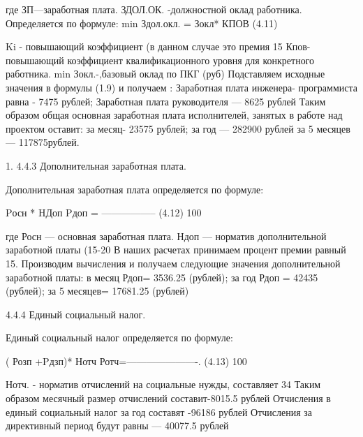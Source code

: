 \begin{ESKDexplanation}
\begin{ESKDexplanation}
\begin{ESKDexplanation}
\begin{ESKDexplanation}
где ЗП—заработная плата.
ЗДОЛ.ОК. -должностной оклад работника. Определяется по формуле:
                                                                                   min
                                          Здол.окл. = Зокл* КПОВ                                                                                                          (4.11)                                                                                                             
                                                                                                                                                          
 Ki   - повышающий коэффициент (в данном случае это премия 15%
Кпов- повышающий коэффициент квалификационного уровня
для конкретного работника.
  min
Зокл.-,базовый оклад по ПКГ (руб)
Подставляем исходные значения в формулы (1.9) и получаем :
Заработная плата инженера- программиста равна   - 7475 рублей;
Заработная плата руководителя — 8625 рублей
Таким образом общая основная заработная плата исполнителей, занятых
в работе над проектом оставит:
за месяц-  23575 рублей;
за год — 282900 рублей
за 5 месяцев — 117875рублей.

	1.	4.4.3 Дополнительная заработная плата.

  Дополнительная заработная плата определяется по формуле:

                                                     Pосн    *   HДоп
                                       Pдоп =  -----------------                                                       (4.12)
                                                            100%

где  Росн — основная заработная плата.
Ндоп — норматив дополнительной заработной платы (15-20%
В наших расчетах принимаем процент премии равный 15.
Производим вычисления и получаем следующие значения дополнительной
заработной платы:
в месяц Рдоп= 3536.25 (рублей); 
за год Рдоп = 42435 (рублей);
за 5 месяцев= 17681.25 (рублей)
 
4.4.4  Единый социальный налог.

Единый социальный налог определяется по формуле:

                                                      ( Розп +Pдзп)* Нотч
                                           Ротч=----------------------.                                            (4.13)
                                                                100%

Нотч. - норматив отчислений на социальные  нужды, составляет 34 %
Таким образом месячный размер отчислений составит-8015.5 рублей
Отчисления в единый социальный налог за год составят -96186 рублей
Отчисления за директивный период будут равны — 40077.5 рублей


\end{ESKDexplanation}
\end{ESKDexplanation}
\end{ESKDexplanation}
\end{ESKDexplanation}
